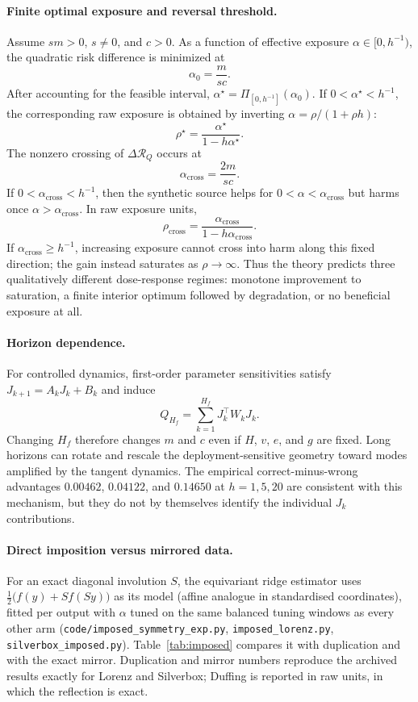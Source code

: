 \paragraph{Finite optimal exposure and reversal threshold.}
Assume $sm>0$, $s\neq0$, and $c>0$. As a function of effective exposure $\alpha\in[0,h^{-1})$, the quadratic risk difference is minimized at
\[
\alpha_0=\frac{m}{sc}.
\]
After accounting for the feasible interval, $\alpha^\star=\Pi_{[0,h^{-1}]}(\alpha_0)$. If $0<\alpha^\star<h^{-1}$, the corresponding raw exposure is obtained by inverting $\alpha=\rho/(1+\rho h)$:
\[
\rho^\star=\frac{\alpha^\star}{1-h\alpha^\star}.
\]
The nonzero crossing of $\Delta\mathcal R_Q$ occurs at
\[
\alpha_{\mathrm{cross}}=\frac{2m}{sc}.
\]
If $0<\alpha_{\mathrm{cross}}<h^{-1}$, then the synthetic source helps for $0<\alpha<\alpha_{\mathrm{cross}}$ but harms once $\alpha>\alpha_{\mathrm{cross}}$. In raw exposure units,
\[
\rho_{\mathrm{cross}}=\frac{\alpha_{\mathrm{cross}}}{1-h\alpha_{\mathrm{cross}}}.
\]
If $\alpha_{\mathrm{cross}}\ge h^{-1}$, increasing exposure cannot cross into harm along this fixed direction; the gain instead saturates as $\rho\to\infty$. Thus the theory predicts three qualitatively different dose-response regimes: monotone improvement to saturation, a finite interior optimum followed by degradation, or no beneficial exposure at all.

\paragraph{Horizon dependence.}
For controlled dynamics, first-order parameter sensitivities satisfy $J_{k+1}=A_kJ_k+B_k$ and induce
\[
Q_{H_f}=\sum_{k=1}^{H_f}J_k^\top W_kJ_k.
\]
Changing $H_f$ therefore changes $m$ and $c$ even if $H$, $v$, $e$, and $g$ are fixed. Long horizons can rotate and rescale the deployment-sensitive geometry toward modes amplified by the tangent dynamics. The empirical correct-minus-wrong advantages $0.00462$, $0.04122$, and $0.14650$ at $h=1,5,20$ are consistent with this mechanism, but they do not by themselves identify the individual $J_k$ contributions.

\paragraph{Direct imposition versus mirrored data.}
For an exact diagonal involution $S$, the equivariant ridge estimator uses $\tfrac12\big(f(y)+Sf(Sy)\big)$ as its model (affine analogue in standardised coordinates), fitted per output with $\alpha$ tuned on the same balanced tuning windows as every other arm (\texttt{code/\allowbreak imposed\_\allowbreak symmetry\_\allowbreak exp.py}, \texttt{imposed\_\allowbreak lorenz.py}, \texttt{silverbox\_\allowbreak imposed.py}). Table~\ref{tab:imposed} compares it with duplication and with the exact mirror. Duplication and mirror numbers reproduce the archived results exactly for Lorenz and Silverbox; Duffing is reported in raw units, in which the reflection is exact.

